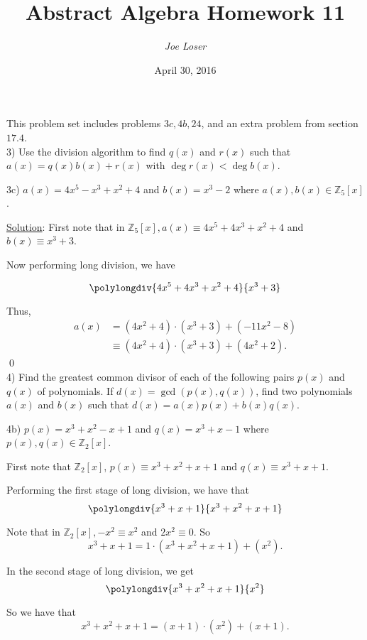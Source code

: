 \documentclass{article}
\title{Abstract Algebra Homework 11}
\author{\textit{Joe Loser}}
\date{April 30, 2016}
\begin{document}
\maketitle

This problem set includes problems $3c, 4b, 24$, and an extra problem from section $17.4$. \\

3) Use the division algorithm to find $q(x)$ and $r(x)$ such that $a(x) = q(x)b(x) + r(x)$ with $\deg r(x) < \deg b(x)$.

3c) $a(x) = 4x^5-x^3+x^2+4$ and $b(x) = x^3-2$ where $a(x), b(x) \in \mathbb{Z}_5[x]$.

\underline{Solution}: First note that in $\mathbb{Z}_5[x], a(x) \equiv 4x^5+4x^3+x^2+4$ and $b(x) \equiv x^3 + 3$.

Now performing long division, we have

$$\polylongdiv{4x^5+4x^3+x^2+4}{x^3+3}$$

Thus,
\begin{align*}
	a(x) &= (4x^2+4) \cdot (x^3+3) + (-11x^2-8) \\
	&\equiv (4x^2+4) \cdot (x^3+3) + (4x^2+2).
\end{align*} 
\qed \\

4) Find the greatest common divisor of each of the following pairs $p(x)$ and $q(x)$ of polynomials. If \linebreak $d(x) = \gcd(p(x), q(x))$, find two polynomials $a(x)$ and $b(x)$ such that $d(x) = a(x)p(x) + b(x)q(x)$.

4b) $p(x) = x^3+x^2-x+1$ and $q(x) = x^3+x-1$ where $p(x), q(x) \in \mathbb{Z}_2[x]$.

First note that $\mathbb{Z}_2[x]$, $p(x) \equiv x^3 + x^2 + x + 1$ and $q(x) \equiv x^3 + x + 1$.

Performing the first stage of long division, we have that
$$\polylongdiv{x^3+x+1}{x^3+x^2+x+1}$$

Note that in $\mathbb{Z}_2[x], -x^2 \equiv x^2$ and $2x^2 \equiv 0$. So 
\begin{equation}
	x^3 + x + 1 = 1 \cdot (x^3+x^2+x+1) + (x^2).
\end{equation}

In the second stage of long division, we get
$$\polylongdiv{x^3+x^2+x+1}{x^2}$$

So we have that
\begin{equation}
	x^3+x^2+x+1 = (x+1) \cdot (x^2) + (x+1).
\end{equation}
\end{document}
